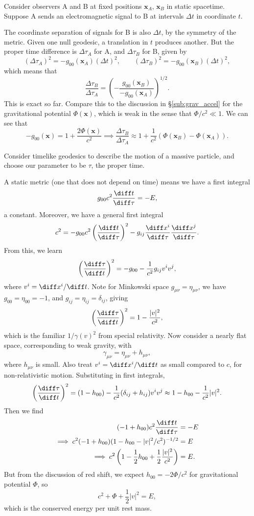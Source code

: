 \documentclass[12pt]{article}
\begin{document}
Consider observers A and B at fixed positions $\mathbf{x}_A$, $\mathbf{x}_B$ in static spacetime. Suppose A sends an electromagnetic signal to B at intervals $\Delta t$ in coordinate $t$.

The coordinate separation of signals for B is also $\Delta t$, by the symmetry of the metric. Given one null geodesic, a translation in $t$ produces another. But the proper time difference is $\Delta \tau_A$ for A, and $\Delta \tau_B$ for B, given by
\[
	(\Delta \tau_A)^2 = -g_{00}(\mathbf{x}_A)(\Delta t)^2, \qquad (\Delta \tau_B)^2 = -g_{00}(\mathbf{x}_B) (\Delta t)^2,
\]
which means that
\[
\frac{\Delta \tau_B}{\Delta \tau_A} = \left( -\frac{g_{00}(\mathbf{x}_B)}{-g_{00}(\mathbf{x}_A)} \right)^{1/2}.
\]
This is exact so far. Compare this to the discussion in \S\ref{sub:grav_accel} for the gravitational potential $\Phi(\mathbf{x})$, which is weak in the sense that $\Phi/c^2 \ll 1$. We can see that
\[
-g_{00}(\mathbf{x}) = 1 + \frac{2 \Phi(\mathbf{x})}{c^2} \implies \frac{\Delta \tau_B}{\Delta \tau_A} \approx 1 + \frac{1}{c^2} (\Phi(\mathbf{x}_B) - \Phi(\mathbf{x}_A)).
\]


Consider timelike geodesics to describe the motion of a massive particle, and choose our parameter to be $\tau$, the proper time.

A static metric (one that does not depend on time) means we have a first integral
\[
g_{00}c^2 \frac{\diff t}{\diff \tau} = -E,
\]
a constant. Moreover, we have a general first integral
\[
c^2 = -g_{00} c^2 \left( \frac{\diff t}{\diff \tau} \right)^2 - g_{ij} \frac{\diff x^i}{\diff \tau} \frac{\diff x^j}{\diff \tau}.
\]
From this, we learn
\[
\left( \frac{\diff \tau}{\diff t} \right)^2 = -g_{00} - \frac{1}{c^2} g_{ij} v^i v^j,
\]
where $v^i = \diff x^i/\diff t$. Note for Minkowski space $g_{\mu \nu} = \eta_{\mu \nu}$, we have $g_{00} = \eta_{00} = -1$, and $g_{ij} = \eta_{ij} = \delta_{ij}$, giving
\[
\left( \frac{\diff \tau}{\diff t}\right)^2 = 1 - \frac{|v|^2}{c^2},
\]
which is the familiar $1/\gamma(v)^2$ from special relativity. Now consider a nearly flat space, corresponding to weak gravity, with
\[
\gamma_{\mu \nu} = \eta_{\mu \nu} + h_{\mu \nu},
\]
where $h_{\mu \nu}$ is small. Also treat $v^i = \diff x^i/\diff t$ as small compared to $c$, for non-relativistic motion. Substituting in first integrals,
\[
\left( \frac{\diff \tau}{\diff t}\right)^2 = (1 - h_{00}) - \frac{1}{c^2} (\delta_{ij} + h_{ij}) v^i v^j \approx 1 - h_{00} - \frac{1}{c^2} |v|^2.
\]
Then we find
\begin{align*}
	(-1 + h_{00})c^2 \frac{\diff t}{\diff \tau} &= -E \\
	\implies c^2(-1 + h_{00})(1 - h_{00} - |v|^2/c^2)^{-1/2} &= E \\
	\implies c^2 \left(1 - \frac{1}{2} h_{00} + \frac{1}{2} \frac{|v|^2}{c^2} \right) &= E.
\end{align*}
But from the discussion of red shift, we expect $h_{00} = -2 \Phi/c^2$ for gravitational potential $\Phi$, so
\[
c^2 + \Phi + \frac{1}{2}|v|^2 = E,
\]
which is the conserved energy per unit rest mass.
\end{document}
